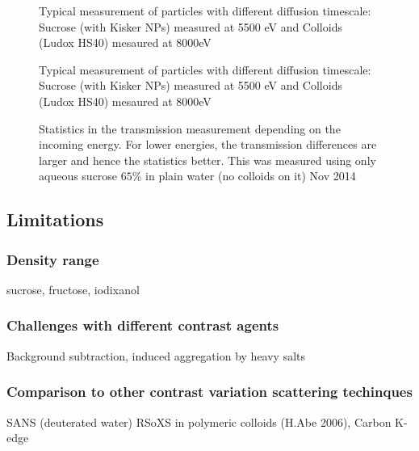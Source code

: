 \begin{figure}%
	\centering
		
		\caption{Typical measurement of particles with different diffusion timescale: Sucrose (with Kisker NPs) measured at 5500 eV and Colloids (Ludox HS40) mesaured at 8000eV}
		\label{fig:LudoxHS40TransmissionCalibration}
\end{figure}

\begin{figure}%
	\centering
		
		\caption{Typical measurement of particles with different diffusion timescale: Sucrose (with Kisker NPs) measured at 5500 eV and Colloids (Ludox HS40) mesaured at 8000eV}
		\label{fig:KiskerTransmissionCalibration}
\end{figure}

\begin{figure}%
	\centering
	\caption{Statistics in the transmission measurement depending on the incoming energy. For lower energies, the transmission differences are larger and hence the statistics better. This was measured using only aqueous sucrose $65\%$ in plain water (no colloids on it) Nov 2014}
\end{figure}


\subsection{Limitations}
\subsubsection{Density range}
sucrose, fructose, iodixanol
\subsubsection{Challenges with different contrast agents}
Background subtraction, induced aggregation by heavy salts
\subsubsection{Comparison to other contrast variation scattering techinques}
SANS (deuterated water)
RSoXS in polymeric colloids (H.Abe 2006), Carbon K-edge


